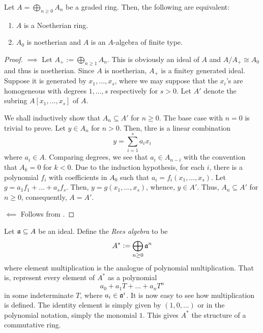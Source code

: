 \begin{proposition}
    Let $A = \bigoplus_{n\ge0} A_n$ be a graded ring. Then, the following are equivalent: 
    \begin{enumerate}[label=(\alph*)]
        \item $A$ is a Noetherian ring. 
        \item $A_0$ is noetherian and $A$ is an $A$-algebra of finite type.
    \end{enumerate}
\end{proposition}
\begin{proof}
    $\implies$ Let $A_+ := \bigoplus_{n\ge 1} A_n$. This is obviously an ideal of $A$ and $A/A_+\cong A_0$ and thus is noetherian. Since $A$ is noetherian, $A_+$ is a finitey generated ideal. Suppose it is generated by $x_1,\dots,x_s$, where we may suppose that the $x_i$'s are homogeneous with degrees $1,\dots, s$ respectively for $s > 0$. Let $A'$ denote the subring $A[x_1,\dots,x_s]$ of $A$.

    We shall inductively show that $A_n\subseteq A'$ for $n\ge 0$. The base case with $n = 0$ is trivial to prove. Let $y\in A_n$ for $n > 0$. Then, thre is a linear combination 
    \begin{equation*}
        y = \sum_{i = 1}^s a_ix_i
    \end{equation*}
    where $a_i\in A$. Comparing degrees, we see that $a_i\in A_{n - i}$ with the convention that $A_{k} = 0$ for $k < 0$. Due to the induction hypothesis, for each $i$, there is a polynomial $f_i$ with coefficients in $A_0$ such that $a_i = f_i(x_1,\dots,x_s)$. Let $g = a_1f_1 + \dots + a_sf_s$. Then, $y = g(x_1,\dots,x_s)$, whence, $y\in A'$. Thus, $A_n\subseteq A'$ for $n\ge 0$, consequently, $A = A'$.

    $\impliedby$ Follows from .
\end{proof}

\begin{definition}
    Let $\mathfrak a\subseteq A$ be an ideal. Define the \emph{Rees algebra} to be 
    \begin{equation*}
        A^\ast := \bigoplus_{n\ge 0}\mathfrak a^n
    \end{equation*}
    where element multiplication is the analogue of polynomial multiplication. That is, represent every element of $A^\ast$ as a polynomial
    \begin{equation*}
        a_0 + a_1T + \dots + a_nT^n
    \end{equation*}
    in some indeterminate $T$, where $a_i\in\mathfrak a^i$. It is now easy to see how multiplication is defined. The identity element is simply given by $(1,0,\dots)$ or in the polynomial notation, simply the monomial $1$. This gives $A^\ast$ the structure of a commutative ring.
\end{definition}

